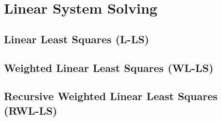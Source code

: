 \section{Linear System Solving}
\subsection{Linear Least Squares (L-LS)}
\subsection{Weighted Linear Least Squares (WL-LS)}
\subsection{Recursive Weighted Linear Least Squares (RWL-LS)}
